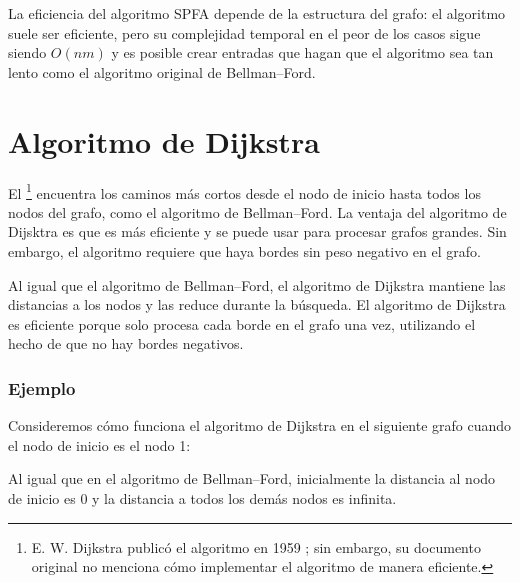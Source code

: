 La eficiencia del algoritmo SPFA depende
de la estructura del grafo:
el algoritmo suele ser eficiente,
pero su complejidad temporal en el peor de los casos sigue siendo
$O(nm)$ y es posible crear entradas
que hagan que el algoritmo sea tan lento como el
algoritmo original de Bellman–Ford.

\section{Algoritmo de Dijkstra}


El \footnote{E. W. Dijkstra publicó el algoritmo en 1959 \cite{dij59};
sin embargo, su documento original no menciona cómo implementar el algoritmo de manera eficiente.}
encuentra los caminos más cortos
desde el nodo de inicio hasta todos los nodos del grafo,
como el algoritmo de Bellman–Ford.
La ventaja del algoritmo de Dijsktra es que
es más eficiente y se puede usar para
procesar grafos grandes.
Sin embargo, el algoritmo requiere que haya
bordes sin peso negativo en el grafo.

Al igual que el algoritmo de Bellman–Ford,
el algoritmo de Dijkstra mantiene las distancias
a los nodos y las reduce durante la búsqueda.
El algoritmo de Dijkstra es eficiente porque
solo procesa
cada borde en el grafo una vez, utilizando el hecho
de que no hay bordes negativos.

\subsubsection{Ejemplo}

Consideremos cómo funciona el algoritmo de Dijkstra
en el siguiente grafo cuando el
nodo de inicio es el nodo 1:
\begin{center}
\end{center}
Al igual que en el algoritmo de Bellman–Ford,
inicialmente la distancia al nodo de inicio es 0
y la distancia a todos los demás nodos es infinita.

